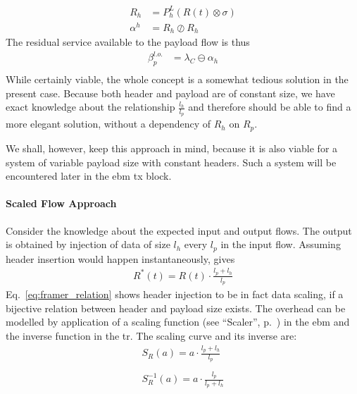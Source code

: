 %
\begin{equation}
\begin{aligned}
R_h &= {P^L_{h}(R(t) \otimes \sigma)}\\
\alpha^h &= R_h \oslash R_h
\label{eq:foi1}
\end{aligned}
\end{equation}
%
The residual service available to the payload flow is thus
%
\begin{equation}
\begin{aligned}
\beta_p^{l.o.} &= \lambda_C \ominus \alpha_h\\
\label{eq:foi2}
\end{aligned}
\end{equation}
%
While certainly viable, the whole concept is a somewhat tedious solution in the present case. Because both header and payload are of constant size, we have exact knowledge
about the relationship $\frac{l_h}{l_p}$ and therefore should be able to find a more elegant solution, without a dependency of $R_h$ on $R_p$.
\par
We shall, however, keep this approach in mind, because it is also viable for a system of variable payload size with constant headers.
Such a system will be encountered later in the \gls{ebm} \gls{tx} block.

\fi

\paragraph{Scaled Flow Approach}
Consider the knowledge about the expected input and output flows. The output is obtained by injection of data of size $l_h$ every $l_p$ in the input flow.
Assuming header insertion would happen instantaneously, gives
%
\begin{equation}
\begin{aligned}
R^*(t) = R(t) \cdot \frac{l_p + l_h}{l_p}
\label{eq:framer_relation}
\end{aligned}
\end{equation}
%
Eq.~\ref{eq:framer_relation} shows header injection to be in fact data scaling, if a bijective relation between header and payload size exists.
The overhead can be modelled by application of a scaling function (see \enquote{Scaler}, p.~\pageref{ssec:nc_elementary}) in the \gls{ebm}
and the inverse function in the \gls{tr}. The scaling curve and its inverse are:
%
\begin{equation}
\begin{aligned}
S_R(a) = a \cdot \frac{l_p + l_h}{l_p}\\
\\
S_R^{-1}(a) = a \cdot \frac{l_p}{l_p + l_h}
\label{eq:scale_framer}
\end{aligned}
\end{equation}
%
